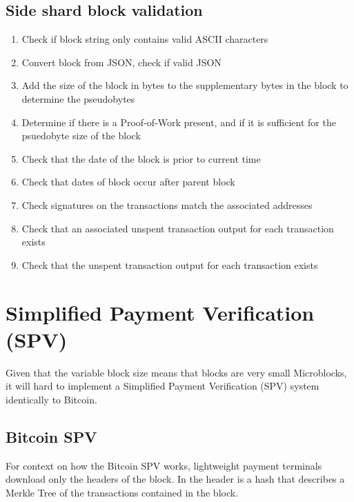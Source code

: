\documentclass[a4paper,12pt]{article}
\begin{document}
\subsection{Side shard block validation}
\begin{enumerate}
  \item Check if block string only contains valid ASCII characters

  \item Convert block from JSON, check if valid JSON

  \item Add the size of the block in bytes to the supplementary bytes in the block to determine the pseudobytes

  \item Determine if there is a Proof-of-Work present, and if it is sufficient for the psuedobyte size of the block

  \item Check that the date of the block is prior to current time

  \item Check that dates of block occur after parent block 

  \item Check signatures on the transactions match the associated addresses

  \item Check that an associated unspent transaction output for each transaction exists

  \item Check that the unspent transaction output for each transaction exists

\end{enumerate}



\section{Simplified Payment Verification (SPV)}
Given that the variable block size means that blocks are very small Microblocks, it will hard to implement a Simplified Payment Verification (SPV) system identically to Bitcoin. 

\subsection{Bitcoin SPV}
For context on how the Bitcoin SPV works, lightweight payment terminals download only the headers of the block. In the header is a hash that describes a Merkle Tree of the transactions contained in the block. 
\end{document}
